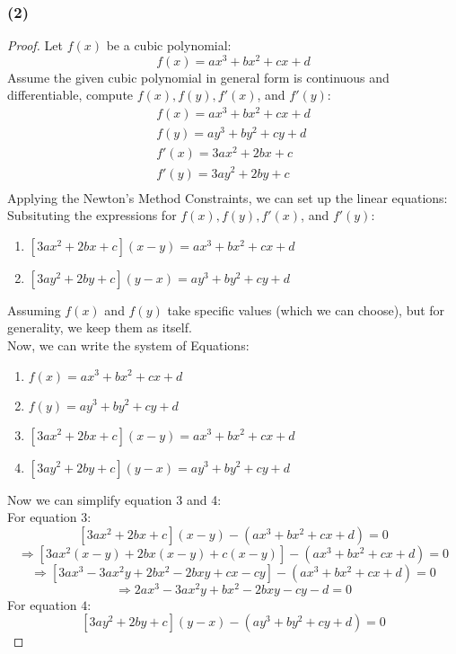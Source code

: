\documentclass{article}
\begin{document}
\subsubsection*{(2)}
\begin{proof}
    Let $f(x)$ be a cubic polynomial:
    \[ f(x) = ax^3 + bx^2 + cx + d \]
    Assume the given cubic polynomial in general form is continuous and differentiable,
    compute $f(x), f(y), f'(x)$, and $f'(y)$:
    \[
        \begin{aligned}
            f(x) = ax^3 + bx^2 + cx + d \\
            f(y) = ay^3 + by^2 + cy + d \\
            f'(x) = 3ax^2 + 2bx + c \\
            f'(y) = 3ay^2 + 2by + c \\
        \end{aligned}
    \]
    Applying the Newton's Method Constraints, we can set up the linear equations:
    Subsituting the expressions for $f(x), f(y), f'(x)$, and $f'(y)$:
    \begin{enumerate}
        \item $[3ax^2 + 2bx + c](x - y) = ax^3 + bx^2 + cx + d $
        \item $[3ay^2 + 2by + c](y - x) = ay^3 + by^2 + cy + d $
    \end{enumerate}
    Assuming $f(x)$ and $f(y)$ take specific values (which we can choose), but for generality, we keep them as itself.
    \\
    Now, we can write the system of Equations:
    \begin{enumerate}
        \item $ f(x) = ax^3 + bx^2 + cx + d $
        \item $ f(y) = ay^3 + by^2 + cy + d $
        \item $ [3ax^2 + 2bx + c](x - y) = ax^3 + bx^2 + cx + d $
        \item $[3ay^2 + 2by + c](y - x) = ay^3 + by^2 + cy + d $
    \end{enumerate}
    Now we can simplify equation 3 and 4:
    \\
    For equation $3$:
    \[ [3ax^2 + 2bx + c](x - y) - (ax^3 + bx^2 + cx + d) = 0 \]
    \[ \Rightarrow [3ax^2(x - y) + 2bx(x - y) + c(x - y)] - (ax^3 + bx^2 + cx + d) = 0 \]
    \[ \Rightarrow [3ax^3 - 3ax^2y + 2bx^2 - 2bxy + cx - cy] - (ax^3 + bx^2 + cx + d) = 0 \]
    \[ \Rightarrow 2ax^3 - 3ax^2y + bx^2 - 2bxy - cy - d = 0 \]
    For equation $4$:
    \[ [3ay^2 + 2by + c](y - x) - (ay^3 + by^2 + cy + d) = 0 \]

\end{proof}
\end{document}

